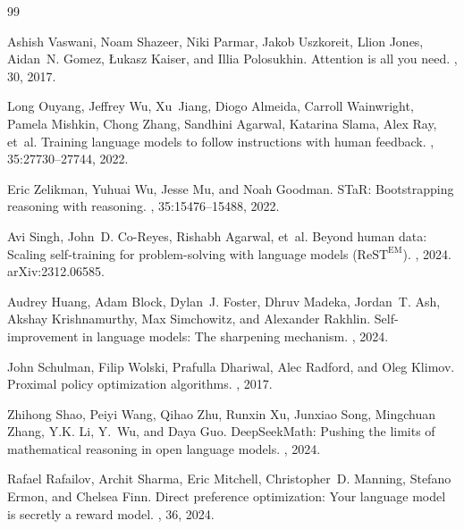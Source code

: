 \documentclass[11pt,a4paper]{article}
\begin{document}
\begin{thebibliography}{99}

Ashish Vaswani, Noam Shazeer, Niki Parmar, Jakob Uszkoreit, Llion Jones, Aidan~N. Gomez, Łukasz Kaiser, and Illia Polosukhin.
\newblock Attention is all you need.
, 30, 2017.

Long Ouyang, Jeffrey Wu, Xu~Jiang, Diogo Almeida, Carroll Wainwright, Pamela Mishkin, Chong Zhang, Sandhini Agarwal, Katarina Slama, Alex Ray, et~al.
\newblock Training language models to follow instructions with human feedback.
, 35:27730--27744, 2022.

Eric Zelikman, Yuhuai Wu, Jesse Mu, and Noah Goodman.
\newblock STaR: Bootstrapping reasoning with reasoning.
, 35:15476--15488, 2022.

Avi Singh, John~D. Co-Reyes, Rishabh Agarwal, et~al.
\newblock Beyond human data: Scaling self-training for problem-solving with language models ($\text{ReST}^{\text{EM}}$).
, 2024. arXiv:2312.06585.

Audrey Huang, Adam Block, Dylan~J. Foster, Dhruv Madeka, Jordan~T. Ash, Akshay Krishnamurthy, Max Simchowitz, and Alexander Rakhlin.
\newblock Self-improvement in language models: The sharpening mechanism.
, 2024.

John Schulman, Filip Wolski, Prafulla Dhariwal, Alec Radford, and Oleg Klimov.
\newblock Proximal policy optimization algorithms.
, 2017.

Zhihong Shao, Peiyi Wang, Qihao Zhu, Runxin Xu, Junxiao Song, Mingchuan Zhang, Y.K. Li, Y.~Wu, and Daya Guo.
\newblock DeepSeekMath: Pushing the limits of mathematical reasoning in open language models.
, 2024.

Rafael Rafailov, Archit Sharma, Eric Mitchell, Christopher~D. Manning, Stefano Ermon, and Chelsea Finn.
\newblock Direct preference optimization: Your language model is secretly a reward model.
, 36, 2024.


\end{thebibliography}
\end{document}
